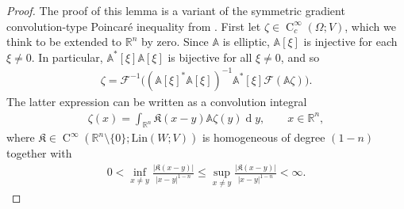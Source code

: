 \documentclass[a4paper,11pt]{amsart}
\numberwithin{equation}{section}
\newcommand{\R}{\mathbb{R}}
\newcommand{\dif}{\operatorname{d}\!}
\newcommand{\hold}{\operatorname{C}}
\begin{document}
	\begin{proof}
		The proof of this lemma is a variant of the symmetric gradient convolution-type Poincar\'{e} inequality from \cite[Prop. 5.1]{gmeineder_regularity_2020}.
		First let $\zeta\in\hold_{c}^{\infty}(\Omega;V)$, which we think to be extended to $\R^{n}$ by zero. Since $\mathbb{A}$ is elliptic, $\mathbb{A}[\xi]$ is injective for each $\xi\neq 0$. In particular, $\mathbb{A}^{*}[\xi]\mathbb{A}[\xi]$ is bijective for all $\xi\neq 0$, and so
		\begin{align*}
			\zeta = \mathscr{F}^{-1}\big((\mathbb{A}[\xi]^{*}\mathbb{A}[\xi])^{-1}\mathbb{A}^{*}[\xi]\mathscr{F}(\mathbb{A}\zeta)\big).
		\end{align*}
		The latter expression can be written as a convolution integral 
		\begin{align}\label{eq:PaulRep}
			\zeta(x) = \int_{\R^{n}}\mathfrak{K}(x-y)\mathbb{A}\zeta(y)\dif y,\qquad x\in\R^{n}, 
		\end{align}
		where $\mathfrak{K}\in\hold^{\infty}(\R^{n}\setminus\{0\};\mathrm{Lin}(W;V))$ is homogeneous of degree $(1-n)$ together with 
		\begin{align*}
			0<\inf_{x\neq y}\frac{|\mathfrak{K}(x-y)|}{|x-y|^{1-n}}\leq \sup_{x\neq y}\frac{|\mathfrak{K}(x-y)|}{|x-y|^{1-n}}<\infty.
		\end{align*}
		

\end{proof}
\end{document}
